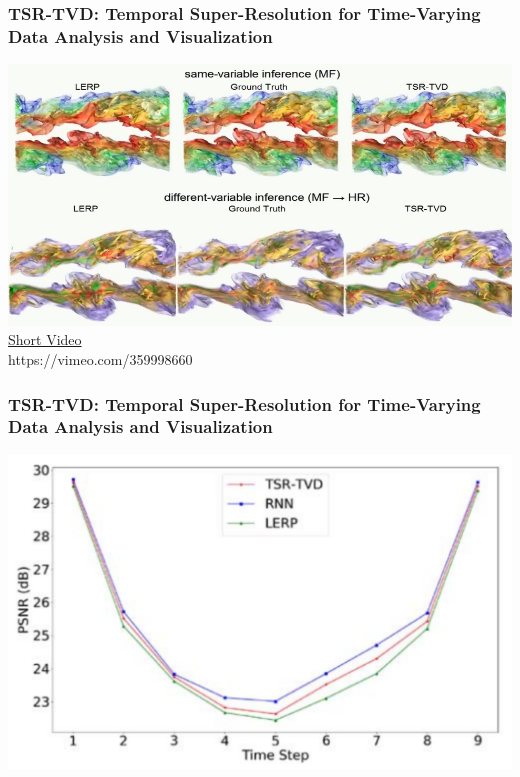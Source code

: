 \begin{frame}
\frametitle{TSR-TVD: Temporal Super-Resolution for Time-Varying Data Analysis and
    Visualization}
    \center\includegraphics[width=0.8\paperwidth]{TSR_Link.png}
    \\
    \href{https://vimeo.com/359998660}{Short Video}\\ 
    https://vimeo.com/359998660
\end{frame}

\begin{frame}
\frametitle{TSR-TVD: Temporal Super-Resolution for Time-Varying Data Analysis and
    Visualization}
    \center\includegraphics[width=0.8\paperwidth]{PSNR.png}
\end{frame}

